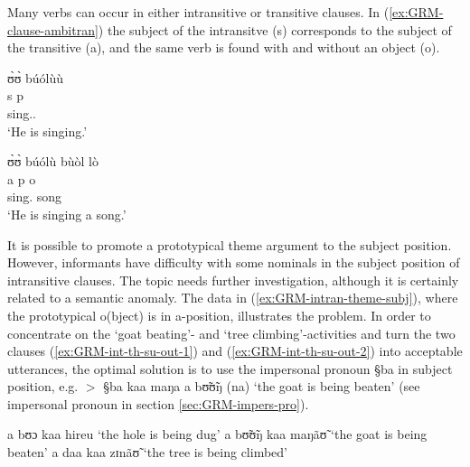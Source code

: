 Many verbs can occur in either  intransitive or transitive clauses. In
(\ref{ex:GRM-clause-ambitran}) the subject of the intransitve ({\sc s})
corresponds to the subject of the transitive ({\sc a}), and the same verb is
found with and without an object ({\sc o}).


\begin{exe}
\ex\label{ex:GRM-clause-ambitran}
\begin{xlist}

\ex\label{ex:vp26.14.}
\glll ʊ̀ʊ̀ búólùù \\
{\sc s} {\sc p}\\
       {\psg} sing.{\ipfv.\foc} \\
\glt  `He is singing.' 

\ex\label{ex:vp26.15.}
\glll  ʊ̀ʊ̀ búólù bùòl lò \\
{\sc a} {\sc p} {\sc o} {}\\
       {\psg}  sing.{\ipfv} song {\foc}    \\
\glt  `He is singing a song.' 

\end{xlist}
\end{exe}


It is possible to promote a prototypical theme argument to the subject position.
However,  informants have difficulty with some nominals in the subject
position of
intransitive clauses.   The topic needs further investigation, although it is
certainly related to a semantic anomaly.  The data in
(\ref{ex:GRM-intran-theme-subj}), where the  prototypical {\sc o}(bject) is in
 {\sc a}-position, illustrates the problem. In order to concentrate on the `goat
beating'- and `tree climbing'-activities and turn the two clauses
(\ref{ex:GRM-int-th-su-out-1}) and (\ref{ex:GRM-int-th-su-out-2}) into
acceptable utterances, the optimal solution is to use the
impersonal pronoun {\S ba} in subject position, e.g. 
$>$  {\S ba kaa maŋa a bʊ̃ʊ̃ŋ (na)} `the goat is being
beaten'  (see impersonal
pronoun in
section \ref{sec:GRM-impers-pro}).



\begin{exe}
\ex\label{ex:GRM-intran-theme-subj}
\begin{xlist}
\ex
a bʊɔ kaa hireu  `the hole is being dug'
\ex\label{ex:GRM-int-th-su-out-1}
\textasteriskcentered a bʊ̃ʊ̃ŋ   kaa maŋãʊ̃  `the goat is being beaten'
\ex\label{ex:GRM-int-th-su-out-2}
\textasteriskcentered a daa kaa zɪnãʊ̃  `the tree is being climbed'

\end{xlist}
\end{exe}


